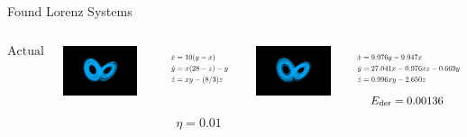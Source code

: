 \documentclass[aspectratio=169]{beamer}
\begin{document}
\begin{frame}{Found Lorenz Systems}
	\begin{columns}
			\[ \text{Actual} \]
			\begin{center}
				\includegraphics[width=0.95\textwidth, trim={4cm, 3.2cm, 4cm, 3.1cm}, clip]{Examples/slide3_lorenz_attractor.pdf}
			\end{center}
			\begin{equation*}
				\resizebox{!}{1.4em}{ $\begin{aligned}
				\dot x &= 10(y - x) \\
				\dot y &= x(28 - z) - y \\
				\dot z &= xy - (8/3) z
				\end{aligned} $}
			\end{equation*}
			\[\text{\small $\phantom{E_\text{der} = 0.00136}$}\]
		\[ \eta = 0.01 \]
		\begin{center}
			\includegraphics[width=0.95\textwidth, trim={4cm, 3.2cm, 4cm, 3.1cm}, clip]{found_lorenz_001.pdf}
		\end{center}
		\begin{equation*}
		\resizebox{!}{1.4em}{ $\begin{aligned}
			\dot x &=  9.976y-9.947x \\
			\dot y &= 27.041x  -0.976xz-0.669y \\
			\dot z &=  0.996xy - 2.650z
		\end{aligned} $}
		\end{equation*}
		\[ \text{\small $E_{\text{der}} = 0.00136$} \]


\end{columns}
\end{frame}
\end{document}
